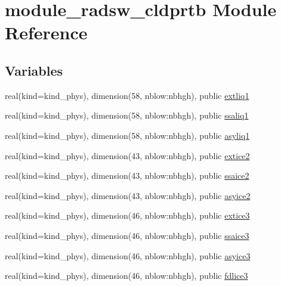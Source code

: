 \hypertarget{namespacemodule__radsw__cldprtb}{}\section{module\+\_\+radsw\+\_\+cldprtb Module Reference}
\label{namespacemodule__radsw__cldprtb}
\subsection*{Variables}
\begin{DoxyCompactItemize}
\item 
real(kind=kind\+\_\+phys), dimension(58, nblow\+:nbhgh), public \hyperlink{namespacemodule__radsw__cldprtb_ac68593a33577c720ca8c74eafb3c9f96}{extliq1}
\item 
real(kind=kind\+\_\+phys), dimension(58, nblow\+:nbhgh), public \hyperlink{group__module__radsw__main_ga7944084ba9f240723dc93467ec66f825}{ssaliq1}
\item 
real(kind=kind\+\_\+phys), dimension(58, nblow\+:nbhgh), public \hyperlink{group__module__radsw__main_ga430be0720aa2e2ac46aa1ec7c9a9b64b}{asyliq1}
\item 
real(kind=kind\+\_\+phys), dimension(43, nblow\+:nbhgh), public \hyperlink{group__module__radsw__main_ga8ed403302034ea073243157749673e14}{extice2}
\item 
real(kind=kind\+\_\+phys), dimension(43, nblow\+:nbhgh), public \hyperlink{group__module__radsw__main_ga48555ff54d3a46f8c49733ff82e94d70}{ssaice2}
\item 
real(kind=kind\+\_\+phys), dimension(43, nblow\+:nbhgh), public \hyperlink{group__module__radsw__main_gad9328ffc5e90cc62c8c9c5089b55fc79}{asyice2}
\item 
real(kind=kind\+\_\+phys), dimension(46, nblow\+:nbhgh), public \hyperlink{group__module__radsw__main_ga8b8bae831aa5b460e260c94e7f24f4c7}{extice3}
\item 
real(kind=kind\+\_\+phys), dimension(46, nblow\+:nbhgh), public \hyperlink{group__module__radsw__main_ga39b045b05e6bc9c04603277654ff8fc6}{ssaice3}
\item 
real(kind=kind\+\_\+phys), dimension(46, nblow\+:nbhgh), public \hyperlink{group__module__radsw__main_gaec2685be0de3a557aca169062cf1055e}{asyice3}
\item 
real(kind=kind\+\_\+phys), dimension(46, nblow\+:nbhgh), public \hyperlink{group__module__radsw__main_gaa42cf6596d2dcd887864b1de40da3293}{fdlice3}
\item 

\end{DoxyCompactItemize}
